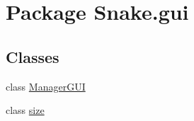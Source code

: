 \hypertarget{namespace_snake_1_1gui}{}\section{Package Snake.\+gui}
\label{namespace_snake_1_1gui}
\subsection*{Classes}
\begin{DoxyCompactItemize}
\item 
class \mbox{\hyperlink{class_snake_1_1gui_1_1_manager_g_u_i}{Manager\+G\+UI}}
\item 
class \mbox{\hyperlink{class_snake_1_1gui_1_1size}{size}}
\end{DoxyCompactItemize}
